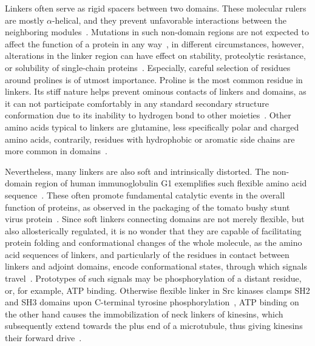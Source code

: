   Linkers often serve as rigid spacers between two domains.
  These molecular rulers are mostly $\alpha$-helical, and they prevent unfavorable
  interactions between the neighboring
  modules~\cite{george2002analysis, wriggers2005control}.
  Mutations in such non-domain regions are not expected to affect the function of a
  protein in any way~\cite{bottema1991missense}, in different circumstances, however,
  alterations in the linker region can have effect on stability, proteolytic resistance,
  or solubility of single-chain proteins~\cite{robinson1998optimizing}.
  Especially, careful selection of residues around prolines is of utmost importance.
  Proline is the most common residue in linkers.
  Its stiff nature helps prevent ominous contacts of linkers and domains, as it can not
  participate comfortably in any standard secondary structure conformation due to its
  inability to hydrogen bond to other
  moieties~\cite{george2002analysis, wriggers2005control}.
  Other amino acids typical to linkers are glutamine, less specifically polar and charged
  amino acids, contrarily, residues with hydrophobic or aromatic side chains are more
  common in domains~\cite{brune2018proteome}.

  Nevertheless, many linkers are also soft and intrinsically distorted.
  The non-domain region of human immunoglobulin G1 exemplifies such flexible amino acid
  sequence~\cite{colman1976structure}.
  These often promote fundamental catalytic events in the overall function of proteins, as
  observed in the packaging of the tomato bushy stunt virus
  protein~\cite{winkler1977tomato}.
  Since soft linkers connecting domains are not merely flexible, but also allosterically
  regulated, it is no wonder that they are capable of facilitating protein folding and
  conformational changes of the whole molecule, as the amino acid sequences of linkers,
  and particularly of the residues in contact between linkers and adjoint domains,
  encode conformational states, through which signals
  travel~\cite{george2002analysis, ma2011dynamic}.
  Prototypes of such signals may be phosphorylation of a distant residue, or, for example,
  ATP binding.
  Otherwise flexible linker in Src kinases clamps SH2 and SH3 domains upon C-terminal
  tyrosine phosphorylation~\cite{young2001dynamic}, ATP binding on the other hand causes
  the immobilization of neck linkers of kinesins, which subsequently extend towards the
  plus end of a microtubule, thus giving kinesins their forward
  drive~\cite{rice1999structural, rosenfeld2001atp, khalil2008kinesin}.

